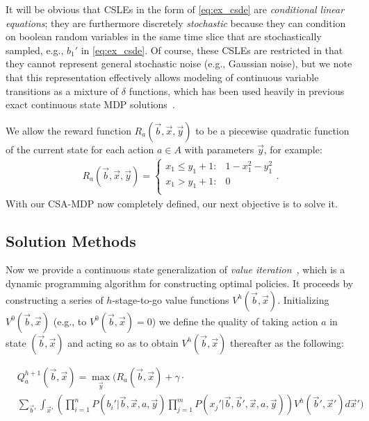It will be obvious that CSLEs in the form of \eqref{eq:ex_csde} are
\emph{conditional linear equations}; they are furthermore discretely 
\emph{stochastic}
because they can condition on boolean random variables in the same time slice
that are stochastically sampled, e.g., $b_1'$ in
\eqref{eq:ex_csde}.  Of course, these CSLEs are restricted in that
they cannot represent general stochastic noise (e.g., Gaussian noise),
but we note that this representation effectively allows modeling of
continuous variable transitions as a mixture of $\delta$ functions,
which has been used heavily in previous exact continuous state MDP 
solutions~\cite{feng04,li05,hao09}.  

We allow the reward function $R_a(\vec{b},\vec{x},\vec{y})$ to be a
piecewise quadratic function of the current state for each action $a
\in A$ with parameters $\vec{y}$, for example:
\begin{align}
R_a(\vec{b},\vec{x},\vec{y}) = \begin{cases}
x_1 \leq y_1 + 1 : & 1 - x_1^2 - y_1^2  \\
x_1 > y_1 + 1:     & 0 \\
\end{cases}. \label{eq:simple_reward}
\end{align}
With our CSA-MDP now completely defined, our next objective
is to solve it.

\subsection{Solution Methods}

\label{sec:soln}

Now we provide a continuous state generalization of {\it
value iteration}~\cite{bellman}, which is a dynamic programming
algorithm for constructing optimal policies.  It proceeds by
constructing a series of $h$-stage-to-go value functions
$V^h(\vec{b},\vec{x})$.  Initializing $V^0(\vec{b},\vec{x})$ 
(e.g., to $V^0(\vec{b},\vec{x}) = 0$) 
we define the quality of taking action $a$ in state
$(\vec{b},\vec{x})$ and acting so as to obtain $V^{h}(\vec{b},\vec{x})$ 
thereafter as the following:
\vspace{-3mm}

{\footnotesize
\begin{align}
& Q_a^{h+1}(\vec{b},\vec{x}) = \max_{\vec{y}} \Bigg( R_a(\vec{b},\vec{x}) + \gamma \cdot \label{eq:qfun} \\ 
& \sum_{\vec{b}'} \int_{\vec{x}'} \left( \prod_{i=1}^n P(b_i'|\vec{b},\vec{x},a,\vec{y}) \prod_{j=1}^m P(x_j'|\vec{b},\vec{b}',\vec{x},a,\vec{y}) \right) V^h(\vec{b}',\vec{x}') d\vec{x}' \Bigg) \nonumber
\end{align}}

